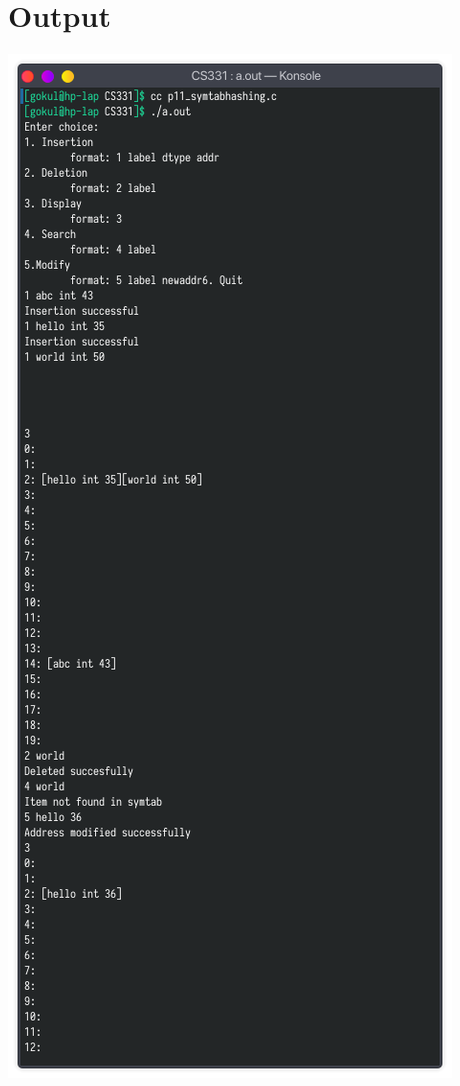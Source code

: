\documentclass[13pt,oneside]{book}
\begin{document}
    \section*{Output}
    \includegraphics[]{img/p11.png}
    
\end{document}
